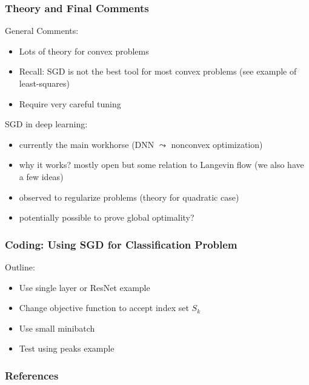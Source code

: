 \documentclass[12pt,fleqn,beamer]{beamer}
\begin{document}
\begin{frame}[fragile]\frametitle{Theory and Final Comments}

General Comments:
\begin{itemize}
\item 
Lots of theory for convex problems
\item
Recall: SGD is not the best tool for most convex problems (see example of least-squares)
\item
Require very careful tuning
\end{itemize}

\bigskip

SGD in deep learning:
\begin{itemize}
	\item currently the main workhorse (DNN $\leadsto$ nonconvex optimization)
	\item why it works? mostly open but some relation to Langevin flow (we also have a few ideas)
	\item observed to regularize problems (theory for quadratic case)
	\item potentially possible to prove global optimality?
\end{itemize}
\end{frame}

\begin{frame}
	\frametitle{Coding: Using SGD for Classification Problem}
	
	Outline:
	\begin{itemize}
		\item Use single layer or ResNet example
		\item Change objective function to accept index set $S_k$
		\item Use small minibatch
		\item Test using peaks example
	\end{itemize}
\end{frame}


\begin{frame}[allowframebreaks]
	\frametitle{References}


\end{frame}
\end{document}
